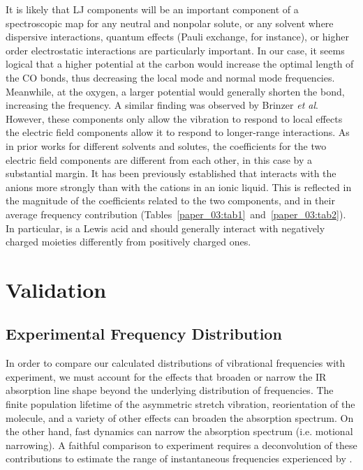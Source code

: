 It is likely that LJ components will be an important component of a spectroscopic map for any neutral and nonpolar solute, or any solvent where dispersive interactions, quantum effects (Pauli exchange, for instance), or higher order electrostatic interactions are particularly important. In our case, it seems logical that a higher potential at the carbon would increase the optimal length of the CO bonds, thus decreasing the local mode and normal mode frequencies. Meanwhile, at the oxygen, a larger potential would generally shorten the bond, increasing the frequency. A similar finding was observed by Brinzer \emph{et al}.\cite{Brinzer2015} However, these components only allow the  vibration to respond to local effects \textemdash{} the electric field components allow it to respond to longer-range interactions. As in prior works for different solvents and solutes, the coefficients for the two electric field components are different from each other, in this case by a substantial margin. It has been previously established that  interacts with the anions more strongly than with the cations in an ionic liquid.\cite{Cadena2004,89,90,91,92,93} This is reflected in the magnitude of the coefficients related to the two components, and in their average frequency contribution (Tables~\ref{paper_03:tab1}~and~\ref{paper_03:tab2}). In particular,  is a Lewis acid and should generally interact with negatively charged moieties differently from positively charged ones.

\section{Validation}
\label{paper_03:sec:V}

\subsection{Experimental Frequency Distribution}
\label{paper_03:ssec:V-A}

In order to compare our calculated distributions of  vibrational frequencies with experiment, we must account for the effects that broaden or narrow the IR absorption line shape beyond the underlying distribution of frequencies. The finite population lifetime of the asymmetric stretch vibration, reorientation of the  molecule, and a variety of other effects can broaden the absorption spectrum. On the other hand, fast dynamics can narrow the absorption spectrum (i.e. motional narrowing). A faithful comparison to experiment requires a deconvolution of these contributions to estimate the range of instantaneous frequencies experienced by .


